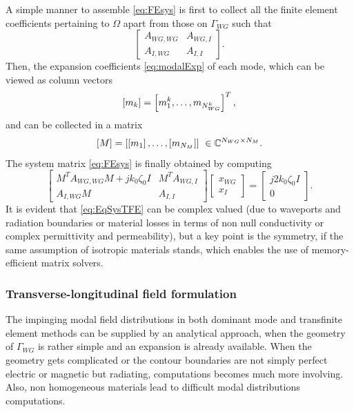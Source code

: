 A simple manner to assemble \eqref{eq:FEsys} is first to collect all the finite element coefficients pertaining to $\Omega$ apart from those on $\Gamma_{WG}$ such that
\begin{equation}
\begin{bmatrix}
A_{WG,WG} & A_{WG,I}\\
A_{I,WG} & A_{I,I}
\end{bmatrix}.
\end{equation}
\noindent Then, the expansion coefficients \eqref{eq:modalExp} of each mode, which can be viewed as column vectors 
$$\left[{{m_k}}\right] = \left[m_1^k, \ldots, m_{N_{WG}^k} \right]^T,$$ 
\noindent and can be collected in a matrix $$\left[M\right] = \left[\left[{{m_1}}\right], \ldots, \left[{{m_{N_{M}}}}\right] \right] \ \in \mathbb{C}^{N_{WG} \times N_M}.$$
\noindent The system matrix \eqref{eq:FEsys} is finally obtained by computing
\begin{equation}
\label{eq:EqSysTFE}
\begin{bmatrix}
M^T A_{WG,WG} M + jk_0\zeta_0 I  & M^T A_{WG,I}\\
A_{I,WG} M & A_{I,I}
\end{bmatrix}
\begin{bmatrix}
x_{WG} \\
x_{I}
\end{bmatrix} =
\begin{bmatrix}
j2 k_0\zeta_0 I \\
0
\end{bmatrix}.
\end{equation}
\noindent It is evident that \eqref{eq:EqSysTFE} can be complex valued (due to waveports and radiation boundaries or material losses in terms of non null conductivity or complex permittivity and permeability), but a key point is the symmetry, if the same assumption of isotropic materials stands, which enables the use of memory-efficient matrix solvers.

\subsubsection*{Transverse-longitudinal field formulation}

The impinging modal field distributions in both dominant mode and transfinite element methods can be supplied by an analytical approach, when the geometry of $\Gamma_{WG}$ is rather simple and an expansion is already available. When the geometry gets complicated or the contour boundaries are not simply perfect electric or magnetic but radiating, computations becomes much more involving. Also, non homogeneous materials lead to difficult modal distributions computations.

